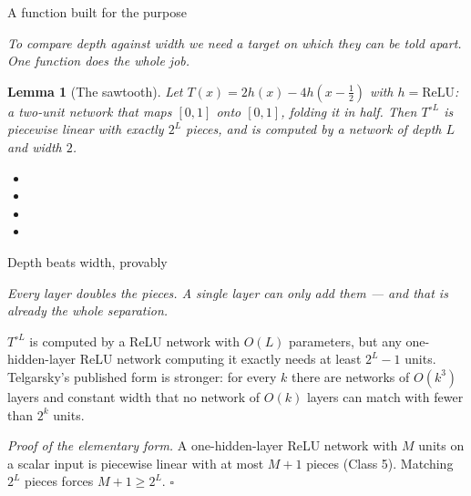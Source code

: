 \documentclass[aspectratio=169, 11pt]{beamer}
\newtheorem{lemmax}[theorem]{Lemma}
\newcommand{\bridge}[1]{%
  {\scriptsize\itshape\color{mcMuted} #1\par}\vspace{0.35em}}
\newcommand{\src}[3]{}      %
\begin{document}
\begin{frame}{A function built for the purpose}
  \src{telgarsky2016}{section}{3.3}
  \bridge{To compare depth against width we need a target on which they
  can be told apart. One function does the whole job.}
  \vspace{0.3em}
  \begin{lemmax}[The sawtooth]
    {\small Let $T(x)=2h(x)-4h(x-\tfrac12)$ with $h=\mathrm{ReLU}$: a
    \alert{two-unit} network that maps $[0,1]$ onto $[0,1]$, folding it
    in half. Then $T^{\circ L}$ is piecewise linear with exactly
    $2^{L}$ pieces, and is computed by a network of depth $L$ and
    width $2$.}
  \end{lemmax}
  \vspace{0.2em}
  {\footnotesize
  \begin{itemize}\setlength{\itemsep}{1pt}
    \item {}
    \item {}
    \item {}
    \item {}
  \end{itemize}}
\end{frame}

\begin{frame}{Depth beats width, provably}
  \src{telgarsky2016}{section}{1.1}
  \src{prince2023}{page}{53}
  \bridge{Every layer doubles the pieces. A single layer can only add
  them --- and that is already the whole separation.}
  \vspace{0.3em}
  \begin{theorem}
    {\small $T^{\circ L}$ is computed by a ReLU network with $O(L)$
    parameters, but any \alert{one-hidden-layer} ReLU network computing
    it exactly needs at least $2^{L}-1$ units. Telgarsky's published
    form is stronger: for every $k$ there are networks of $O(k^{3})$
    layers and constant width that no network of $O(k)$ layers can match
    with fewer than $2^{k}$ units.}
  \end{theorem}
  \vspace{0.3em}
  {\small
  \emph{Proof of the elementary form.} A one-hidden-layer ReLU network
  with $M$ units on a scalar input is piecewise linear with at most
  $M+1$ pieces (Class 5). Matching $2^{L}$ pieces forces
  $M+1\geq 2^{L}$. \hfill$\square$}
\end{frame}
\end{document}
